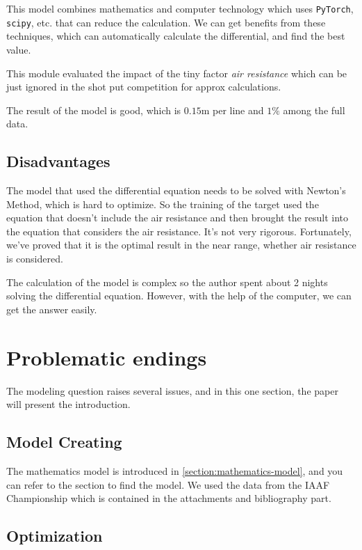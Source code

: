\documentclass{article}
\begin{document}
This model combines mathematics and computer technology which uses \texttt{PyTorch}, \texttt{scipy}, etc. that can reduce the calculation. We can get benefits from these techniques, which can automatically calculate the differential, and find the best value.

This module evaluated the impact of the tiny factor \textit{air resistance} which can be just ignored in the shot put competition for approx calculations.

The result of the model is good, which is $0.15\si{\meter}$ per line and $1\%$ among the full data.

\subsection{Disadvantages}

The model that used the differential equation needs to be solved with Newton's Method, which is hard to optimize. So the training of the target used the equation that doesn't include the air resistance and then brought the result into the equation that considers the air resistance. It's not very rigorous. Fortunately, we've proved that it is the optimal result in the near range, whether air resistance is considered.

The calculation of the model is complex so the author spent about 2 nights solving the differential equation. However, with the help of the computer, we can get the answer easily.

\section{Problematic endings}

\label{section:problematic-endings}

The modeling question raises several issues, and in this one section, the paper will present the introduction.

\subsection{Model Creating}

The mathematics model is introduced in \ref{section:mathematics-model}, and you can refer to the section to find the model. We used the data from the IAAF Championship which is contained in the attachments and bibliography part.

\subsection{Optimization}
\end{document}
